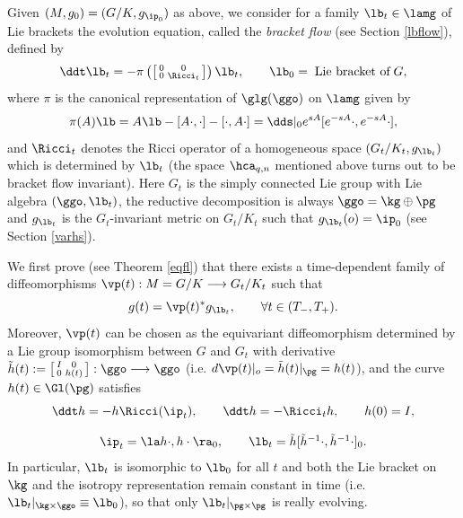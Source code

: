 \documentclass[11pt]{amsart}
\theoremstyle{plain}
\theoremstyle{definition}
\theoremstyle{remark}
\begin{document}
Given $(M,g_0)=(G/K,g_{\ip_0})$ as above, we consider for a family $\lb_t\in\lamg$ of Lie brackets the evolution equation, called the {\it bracket flow} (see Section \ref{lbflow}), defined by
\begin{equation}\label{BFint}
\ddt\lb_t=-\pi\left(\left[\begin{smallmatrix} 0&0\\ 0&\Ricci_t
\end{smallmatrix}\right]\right)\lb_t, \qquad \lb_0=\;\mbox{Lie bracket of}\; G,
\end{equation}
where $\pi$ is the canonical representation of $\glg(\ggo)$ on $\lamg$ given by
\begin{equation}\label{actiongint}
\pi(A)\lb=A\lb-[A\cdot,\cdot]-[\cdot,A\cdot] =\dds|_0 e^{sA}[e^{-sA}\cdot,e^{-sA}\cdot],
\end{equation}
and $\Ricci_t$ denotes the Ricci operator of a homogeneous space $(G_t/K_t,g_{\lb_t})$ which is determined by $\lb_t$ (the space $\hca_{q,n}$ mentioned above turns out to be bracket flow invariant).  Here $G_t$ is the simply connected Lie group with Lie algebra $(\ggo,\lb_t)$, the reductive decomposition is always  $\ggo=\kg\oplus\pg$ and $g_{\lb_t}$ is the $G_t$-invariant metric on $G_t/K_t$ such that $g_{\lb_t}(o)=\ip_0$ (see Section \ref{varhs}).

We first prove (see Theorem \ref{eqfl}) that there exists a time-dependent family of diffeomorphisms $\vp(t):M=G/K\longrightarrow G_t/K_t$ such that
$$
g(t)=\vp(t)^*g_{\lb_t}, \qquad\forall t\in (T_-,T_+).
$$
Moreover, $\vp(t)$ can be chosen as the equivariant diffeomorphism determined by a Lie group isomorphism between $G$ and $G_t$ with derivative $\tilde{h}(t):=\left[\begin{smallmatrix} I&0\\ 0&h(t) \end{smallmatrix}\right]:\ggo\longrightarrow\ggo$ (i.e. $d\vp(t)|_o=\tilde{h}(t)|_{\pg}=h(t)$), and the curve $h(t)\in\Gl(\pg)$ satisfies
$$
\begin{array}{c}
\ddt h=-h\Ricci(\ip_t), \qquad \ddt h=-\Ricci_t h, \qquad h(0)=I, \\ \\
 \ip_t=\la h\cdot,h\cdot\ra_0, \qquad \lb_t =\tilde{h}[\tilde{h}^{-1}\cdot,\tilde{h}^{-1}\cdot]_0.
\end{array}
$$
In particular, $\lb_t$ is isomorphic to $\lb_0$ for all $t$ and both the Lie bracket on $\kg$ and the isotropy representation remain constant in time (i.e. $\lb_t|_{\kg\times\ggo}\equiv\lb_0$), so that only $\lb_t|_{\pg\times\pg}$ is really evolving.
\end{document}
